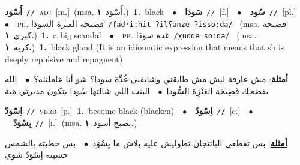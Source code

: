 \documentclass[10pt,a4paper,twoside]{article} %
\begin{document}
\begin{multicols}{2}
{\setlength\topsep{0pt}\textbf{\foreignlanguage{arabic}{أَسْوَد}}\ {\color{gray}\texttt{//}\color{black}}\ \textsc{adj}\ [m.]\ \color{gray}(msa. \foreignlanguage{arabic}{أَسْوَد}~\foreignlanguage{arabic}{\textbf{١.}})\color{black}\ \textbf{1.}~black\ \ $\bullet$\ \ \setlength\topsep{0pt}\textbf{\foreignlanguage{arabic}{سَودَا}}\ {\color{gray}\texttt{//}\color{black}}\ [f.]\ \ $\bullet$\ \ \setlength\topsep{0pt}\textbf{\foreignlanguage{arabic}{سُود}}\ {\color{gray}\texttt{//}\color{black}}\ [pl.]\ \ $\bullet$\ \ \textsc{ph.} \color{gray} \foreignlanguage{arabic}{فضيحة العنزة السودَا}\color{black}\ {\color{gray}\texttt{/{\sffamily fadˤiːħit ʔilʕanze ʔissoːda}/}\color{black}}\ \color{gray} (msa. \foreignlanguage{arabic}{فضيحة كبرى}~\foreignlanguage{arabic}{\textbf{١.}})\color{black}\ \textbf{1.}~a big scandal\ \ $\bullet$\ \ \textsc{ph.} \color{gray} \foreignlanguage{arabic}{غدة سودَا}\color{black}\ {\color{gray}\texttt{/{\sffamily ɣudde soːda}/}\color{black}}\ \color{gray} (msa. \foreignlanguage{arabic}{كريه}~\foreignlanguage{arabic}{\textbf{١.}})\color{black}\ \textbf{1.}~black gland (It is an idiomatic expression that means that sb is deeply repulsive and repugnent)\  \begin{flushright}\color{gray}\foreignlanguage{arabic}{\textbf{\underline{\foreignlanguage{arabic}{أمثلة}}}: مش عارفة ليش مش طايقني وشايفني غُدِّة سودا؟ شو أنا عاملتله؟\ $\bullet$\ \  الله يفضحك فَضِيحَة العَنْزِة السُّودا\ $\bullet$\ \  البنت اللي شالتها سُودا بتكون مديرتي هبة}\end{flushright}\color{black}} \vspace{2mm}

{\setlength\topsep{0pt}\textbf{\foreignlanguage{arabic}{اِسْوَدّ}}\ {\color{gray}\texttt{//}\color{black}}\ \textsc{verb}\ [p.]\ \textbf{1.}~become black (blacken)\ \ $\bullet$\ \ \setlength\topsep{0pt}\textbf{\foreignlanguage{arabic}{اِسْوَدّ}}\ {\color{gray}\texttt{//}\color{black}}\ [c.]\ \ $\bullet$\ \ \setlength\topsep{0pt}\textbf{\foreignlanguage{arabic}{يِسْوَدّ}}\ {\color{gray}\texttt{//}\color{black}}\ [i.]\ \color{gray}(msa. \foreignlanguage{arabic}{يصبح أسود}~\foreignlanguage{arabic}{\textbf{١.}})\color{black}\  \begin{flushright}\color{gray}\foreignlanguage{arabic}{\textbf{\underline{\foreignlanguage{arabic}{أمثلة}}}: بس تقطعي الباتنجان تطوليش عليه بلاش ما يِسْوَد\ $\bullet$\ \  بس حطيته بالشمس حسيته اِسْوَدّ شوي}\end{flushright}\color{black}} \vspace{2mm}


\end{multicols}
\end{document}
